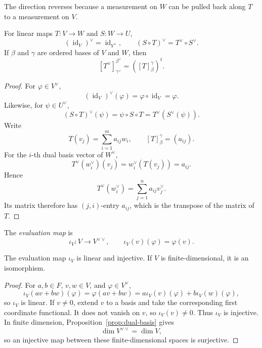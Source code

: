 The direction reverses because a measurement on \(W\) can be pulled back
along \(T\) to a measurement on \(V\).

\begin{proposition}
For linear maps \(T:V\to W\) and \(S:W\to U\),
\[
(\operatorname{id}_V)^\vee=\operatorname{id}_{V^\vee},
\qquad
(S\circ T)^\vee=T^\vee\circ S^\vee.
\]
If \(\beta\) and \(\gamma\) are ordered bases of \(V\) and \(W\), then
\[
[T^\vee]^{\beta^\vee}_{\gamma^\vee}
=\left([T]^\gamma_\beta\right)^t.
\]
\end{proposition}
\begin{proof}
For \(\varphi\in V^\vee\),
\[
(\operatorname{id}_V)^\vee(\varphi)
=\varphi\circ\operatorname{id}_V=\varphi.
\]
Likewise, for \(\psi\in U^\vee\),
\[
(S\circ T)^\vee(\psi)
=\psi\circ S\circ T
=T^\vee(S^\vee(\psi)).
\]
Write
\[
T(v_j)=\sum_{i=1}^ma_{ij}w_i,
\qquad
[T]^\gamma_\beta=(a_{ij}).
\]
For the \(i\)-th dual basis vector of \(W^\vee\),
\[
T^\vee(w_i^\vee)(v_j)=w_i^\vee(T(v_j))=a_{ij}.
\]
Hence
\[
T^\vee(w_i^\vee)=\sum_{j=1}^na_{ij}v_j^\vee.
\]
Its matrix therefore has \((j,i)\)-entry \(a_{ij}\), which is the transpose
of the matrix of \(T\).
\end{proof}

\begin{definition}
The \emph{evaluation map} is
\[
\iota_V:V\longrightarrow V^{\vee\vee},
\qquad
\iota_V(v)(\varphi)=\varphi(v).
\]
\end{definition}

\begin{proposition}\label{prop:double-dual}
The evaluation map \(\iota_V\) is linear and injective.  If \(V\) is
finite-dimensional, it is an isomorphism.
\end{proposition}
\begin{proof}
For \(a,b\in F\), \(v,w\in V\), and \(\varphi\in V^\vee\),
\[
\iota_V(av+bw)(\varphi)
=\varphi(av+bw)
=a\iota_V(v)(\varphi)+b\iota_V(w)(\varphi),
\]
so \(\iota_V\) is linear.  If \(v\ne0\), extend \(v\) to a basis and take
the corresponding first coordinate functional.  It does not vanish on
\(v\), so \(\iota_V(v)\ne0\).  Thus \(\iota_V\) is injective.  In finite
dimension, Proposition~\ref{prop:dual-basis} gives
\[
\dim V^{\vee\vee}=\dim V,
\]
so an injective map between these finite-dimensional spaces is surjective.
\end{proof}

